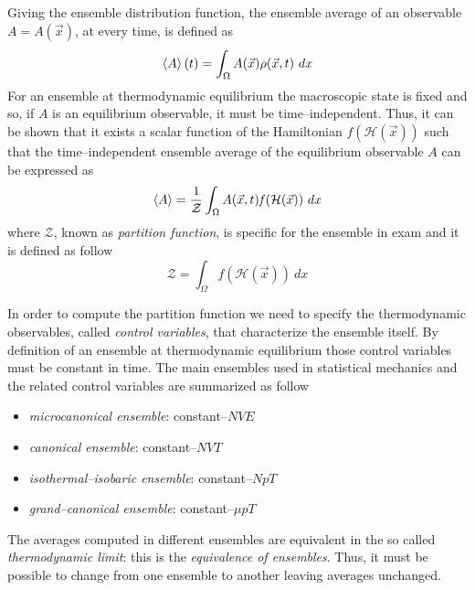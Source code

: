 Giving the ensemble distribution function, the ensemble average of an observable $A=A(\vec x)$, at every time, is
defined as
\begin{equation*}
	\left \langle A \right \rangle(t) = \int_\Omega A(\vec x)\rho(\vec x, t)\ dx
\end{equation*}
For an ensemble at thermodynamic equilibrium the macroscopic state is fixed and so, if $A$ is an equilibrium
observable, it must be time--independent. Thus, it can be shown \cite{Tuckerman} that it exists a scalar function 
of the Hamiltonian $\mathit{f}(\mathcal{H}(\vec x))$ such that the time--independent ensemble average of the
equilibrium observable $A$ can be expressed as
\begin{equation*}
	\left \langle A \right \rangle = \frac{1}{\mathcal{Z}} \int_\Omega A(\vec x, t) \mathit{f}(\mathcal{H}(\vec x))\ dx
\end{equation*}
where $\mathcal{Z}$, known as \textit{partition function}, is specific for the ensemble in exam and it is defined
as follow
\begin{equation*}
	\mathcal{Z} = \int_\Omega \mathit{f}(\mathcal{H}(\vec x))\ dx
\end{equation*}

In order to compute the partition function we need to specify the thermodynamic observables, called
\textit{control variables}, that characterize the ensemble itself. By definition of an ensemble at thermodynamic
equilibrium those control variables must be constant in time. The main ensembles used in statistical mechanics
and the related control variables are summarized as follow
\begin{itemize}
	\item \textit{microcanonical ensemble}: constant--$NVE$
	\item \textit{canonical ensemble}: constant--$NVT$
	\item \textit{isothermal--isobaric ensemble}: constant--$NpT$
	\item \textit{grand--canonical ensemble}: constant--$\mu pT$
\end{itemize}
The averages computed in different ensembles are equivalent in the so called \textit{thermodynamic limit}: this
is the \textit{equivalence of ensembles}. Thus, it must be possible to change from one ensemble to another
leaving averages unchanged.


